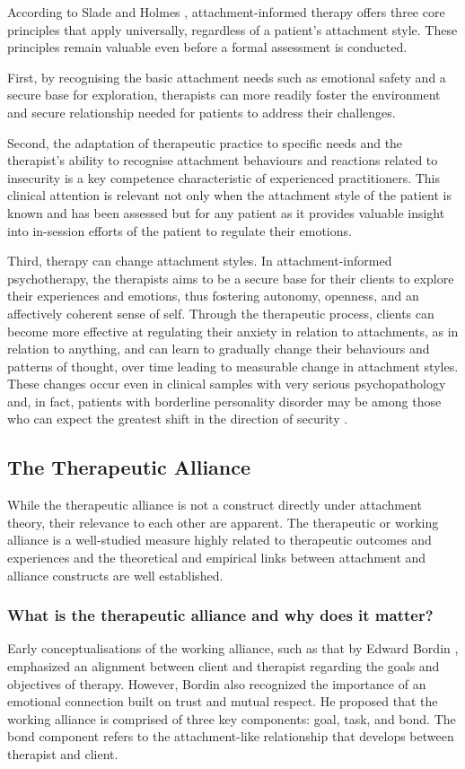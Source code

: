 \documentclass[12pt]{report}
\begin{document}
According to Slade and Holmes \cite{Slade2019}, attachment-informed therapy offers three core principles that apply universally, regardless of a patient's attachment style.
These principles remain valuable even before a formal assessment is conducted.

First, by recognising the basic attachment needs such as emotional safety and a secure base for exploration, therapists can more readily foster the environment and secure relationship needed for patients to address their challenges.

Second, the adaptation of therapeutic practice to specific needs and the therapist's ability to recognise attachment behaviours and reactions related to insecurity is a key competence characteristic of experienced practitioners. This clinical attention is relevant not only when the attachment style of the patient is known and has been assessed but for any patient as it provides valuable insight into in-session efforts of the patient to regulate their emotions.

Third, therapy can change attachment styles. In attachment-informed psychotherapy, the therapists aims to be a secure base for their clients to explore their experiences and emotions, thus fostering autonomy, openness, and an affectively coherent sense of self. Through the therapeutic process, clients can become more effective at regulating their anxiety in relation to attachments, as in relation to anything, and can learn to gradually change their behaviours and patterns of thought, over time leading to measurable change in attachment styles.
These changes occur even in clinical samples with very serious psychopathology \cite{Fonagy1996} and, in fact, patients with borderline personality disorder may be among those who can expect the greatest shift in the direction of security \cite{Levy2006, Stovall2003}.

\subsection{The Therapeutic Alliance}
While the therapeutic alliance is not a construct directly under attachment theory, their relevance to each other are apparent. The therapeutic or working alliance is a well-studied measure highly related to therapeutic outcomes and experiences and the theoretical and empirical links between attachment and alliance constructs are well established.

\subsubsection*{What is the therapeutic alliance and why does it matter?}
Early conceptualisations of the working alliance, such as that by Edward Bordin \cite{Bordin1979}, emphasized an alignment between client and therapist regarding the goals and objectives of therapy. However, Bordin also recognized the importance of an emotional connection built on trust and mutual respect. He proposed that the working alliance is comprised of three key components: goal, task, and bond. The bond component refers to the attachment-like relationship that develops between therapist and client.
\end{document}
